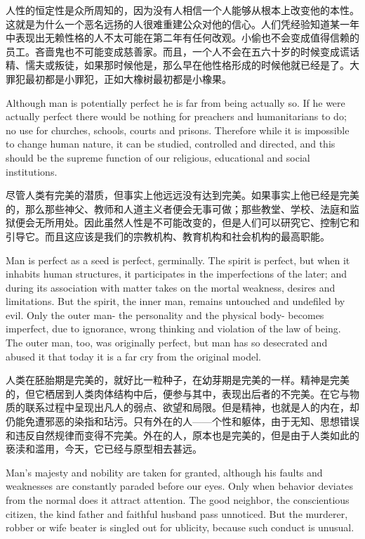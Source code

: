 \documentclass[cs4size, a4paper,12pt]{article}
\newcounter{numpar}
\newcommand*{\newpar}{\numpar{}}
\begin{document}
人性的恒定性是众所周知的，因为没有人相信一个人能够从根本上改变他的本性。这就是为什么一个恶名远扬的人很难重建公众对他的信心。人们凭经验知道某一年中表现出无赖性格的人不太可能在第二年有任何改观。小偷也不会变成值得信赖的员工。吝啬鬼也不可能变成慈善家。而且，一个人不会在五六十岁的时候变成谎话精、懦夫或叛徒，如果那时候他是，那么早在他性格形成的时候他就已经是了。大罪犯最初都是小罪犯，正如大橡树最初都是小橡果。

\newpar Although man is potentially perfect he is far from being actually so. If he were actually perfect there would be nothing for preachers and humanitarians to do; no use for churches, schools, courts and prisons. Therefore while it is impossible to change human nature, it can be studied, controlled and directed, and this should be the supreme function of our religious, educational and social institutions.

尽管人类有完美的潜质，但事实上他远远没有达到完美。如果事实上他已经是完美的，那么那些神父、教师和人道主义者便会无事可做；那些教堂、学校、法庭和监狱便会无所用处。因此虽然人性是不可能改变的，但是人们可以研究它、控制它和引导它。而且这应该是我们的宗教机构、教育机构和社会机构的最高职能。

\newpar Man is perfect as a seed is perfect, germinally. The spirit is perfect, but when it inhabits human structures, it participates in the imperfections of the later; and during its association with matter takes on the mortal weakness, desires and limitations. But the spirit, the inner man, remains untouched and undefiled by evil. Only the outer man- the personality and the physical body- becomes imperfect, due to ignorance, wrong thinking and violation of the law of being. The outer man, too, was originally perfect, but man has so desecrated and abused it that today it is a far cry from the original model.

人类在胚胎期是完美的，就好比一粒种子，在幼芽期是完美的一样。精神是完美的，但它栖居到人类肉体结构中后，便参与其中，表现出后者的不完美。在它与物质的联系过程中呈现出凡人的弱点、欲望和局限。但是精神，也就是人的内在，却仍能免遭邪恶的染指和玷污。只有外在的人——个性和躯体，由于无知、思想错误和违反自然规律而变得不完美。外在的人，原本也是完美的，但是由于人类如此的亵渎和滥用，今天，它已经与原型相去甚远。

\newpar Man's majesty and nobility are taken for granted, although his faults and weaknesses are constantly paraded before our eyes. Only when behavior deviates from the normal does it attract attention. The good neighbor, the conscientious citizen, the kind father and faithful husband pass unnoticed. But the murderer, robber or wife beater is singled out for ublicity, because such conduct is unusual.
\end{document}
